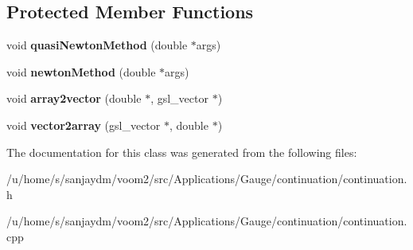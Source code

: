 \subsection*{Protected Member Functions}
\begin{DoxyCompactItemize}
\item 
\hypertarget{class_nonlinear_solver_a59db119f6172a01055eccc1872507370}{
void {\bfseries quasiNewtonMethod} (double $\ast$args)}
\label{class_nonlinear_solver_a59db119f6172a01055eccc1872507370}

\item 
\hypertarget{class_nonlinear_solver_a21e13c00546625acce62ef575271335d}{
void {\bfseries newtonMethod} (double $\ast$args)}
\label{class_nonlinear_solver_a21e13c00546625acce62ef575271335d}

\item 
\hypertarget{class_nonlinear_solver_a0eb83cedf5f8e5713fd28bf7f9061bdf}{
void {\bfseries array2vector} (double $\ast$, gsl\_\-vector $\ast$)}
\label{class_nonlinear_solver_a0eb83cedf5f8e5713fd28bf7f9061bdf}

\item 
\hypertarget{class_nonlinear_solver_a1211c097ec581a5ef6a272641ad3b88c}{
void {\bfseries vector2array} (gsl\_\-vector $\ast$, double $\ast$)}
\label{class_nonlinear_solver_a1211c097ec581a5ef6a272641ad3b88c}

\end{DoxyCompactItemize}


The documentation for this class was generated from the following files:\begin{DoxyCompactItemize}
\item 
/u/home/s/sanjaydm/voom2/src/Applications/Gauge/continuation/continuation.h\item 
/u/home/s/sanjaydm/voom2/src/Applications/Gauge/continuation/continuation.cpp\end{DoxyCompactItemize}
